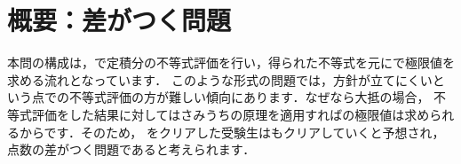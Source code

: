 \documentclass[../../../doc/main]{subfiles}
\begin{document}
    \setcounter{chapter}{1}
    \setcounter{section}{0}
    \section{概要：差がつく問題}\label{概要1}
        本問の構成は，\kakkoichi で定積分の不等式評価を行い，得られた不等式を元に\kakkoni で極限値を求める流れとなっています．
        このような形式の問題では，方針が立てにくいという点で\kakkoichi の不等式評価の方が難しい傾向にあります．なぜなら大抵の場合，
        不等式評価をした結果に対してはさみうちの原理を適用すれば\kakkoni の極限値は求められるからです．そのため，\kakkoichi 
        をクリアした受験生は\kakkoni もクリアしていくと予想され，点数の差がつく問題であると考えられます．
\end{document}
